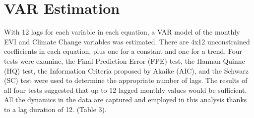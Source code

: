 \section{VAR Estimation} With 12 lags for each variable in each equation, a VAR model of the monthly EVI and Climate Change variables was estimated. There are 4x12 unconstrained coefficients in each equation, plus one for a constant and one for a trend. Four tests were examine, the Final Prediction Error (FPE) test, the Hannan Quinne (HQ) test, the Information Criteria proposed by Akaike (AIC), and the Schwarz (SC) test were used to determine the appropriate number of lags. The results of all four tests suggested that up to 12 lagged monthly values would be sufficient. All the dynamics in the data are captured and employed in this analysis thanks to a lag duration of 12. (Table 3).

